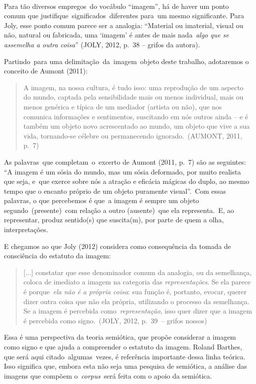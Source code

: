 \documentclass[
  letterpaper,
]{scrbook}
\begin{document}
~

Para tão diversos empregos~do vocábulo ``imagem'', há de haver um ponto
comum que justifique~significados~diferentes para~um mesmo significante.
Para Joly, esse ponto comum parece ser a analogia: ``Material ou
imaterial, visual ou não, natural ou fabricada, uma `imagem' é antes de
mais nada~\emph{algo que se assemelha a outra coisa}'' (JOLY, 2012,
p.~38 -- grifos da autora).~

Partindo~para uma delimitação~da~imagem~objeto deste trabalho,
adotaremos o conceito de Aumont (2011):~ ~

\begin{quote}
A imagem, na nossa cultura, é tudo isso: uma reprodução de um aspecto do
mundo, captada pela sensibilidade mais ou menos individual, mais ou
menos genérica e típica de um mediador (artista ou não), que nos
comunica informações e sentimentos, suscitando em nós outros ainda -- e
é também um objeto novo acrescentado ao mundo, um objeto que vive a sua
vida, tornando-se célebre ou permanecendo ignorado.~(AUMONT, 2011,
p.~7)~ ~
\end{quote}

As palavras~que completam~o~excerto de Aumont (2011, p.~7) são as
seguintes: ``A imagem é um sósia do mundo, mas um sósia deformado, por
muito realista que seja, e~que exerce sobre nós a atração e eficácia
mágicas do duplo, ao mesmo tempo que o encanto próprio de um objeto
puramente visual''.~Com essas palavras, o que percebemos é que~a imagem
é sempre um objeto segundo~(presente)~com relação a outro (ausente)~que
ela representa.~E, ao representar, produz sentido(s) que suscita(m), por
parte de quem a olha, interpretações.~

E chegamos ao que Joly (2012) considera como consequência da tomada de
consciência do estatuto da imagem: ~

\begin{quote}
{[}...{]} constatar que esse denominador comum da analogia, ou da
semelhança, coloca de imediato a imagem na categoria das
\emph{representações}. Se ela parece é porque~\emph{ela não é a própria
coisa}: sua função é, portanto, evocar, querer dizer outra coisa que não
ela própria, utilizando o processo da semelhança. Se a imagem é
percebida como~\emph{representação}, isso quer dizer que a imagem é
percebida como signo.~(JOLY, 2012, p.~39~-- grifos nossos)~ ~
\end{quote}

Essa é uma perspectiva da teoria semiótica, que propõe considerar a
imagem como signo e que ajuda a compreender o estatuto da imagem. Roland
Barthes, que será aqui citado~algumas~vezes, é referência importante
dessa linha teórica. Isso significa que, embora esta não seja uma
pesquisa de semiótica, a análise das imagens que compõem
o~\emph{corpus}~será feita com o apoio da semiótica.~
\end{document}

